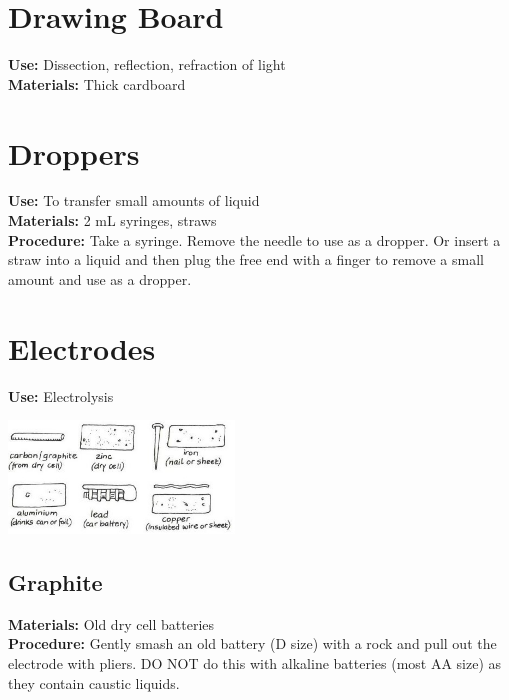 \begin{multicols}{2}
\section{Drawing Board}
\label{sec:drawing-board}
\vspace{-10pt}
\textbf{Use:} Dissection, reflection, refraction of light\\
\textbf{Materials:} Thick cardboard

\section{Droppers}
\label{sec:droppers}
\vspace{-10pt}
\textbf{Use:} To transfer small amounts of liquid \\
\textbf{Materials:} 2 mL syringes, straws\\
\textbf{Procedure:} Take a syringe. Remove the needle to use as a dropper. Or insert a straw into a liquid and then plug the free end with a finger to remove a small amount and use as a dropper.

\section{Electrodes}
\label{sec:electrodes}
\vspace{-10pt}
\textbf{Use:} Electrolysis
\begin{center}
\includegraphics[width=0.45\textwidth]{./img/vso/electrodes.jpg}
\end{center}

\subsection{Graphite}
\vspace{-6pt}
\textbf{Materials:} Old dry cell batteries\\
\textbf{Procedure:} Gently smash an old battery (D size) with a rock and pull out the electrode with pliers. DO NOT do this with alkaline batteries (most AA size) as they contain caustic liquids.

\end{multicols}
